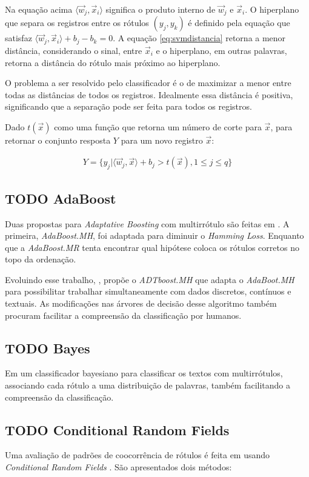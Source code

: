 \documentclass[runningheads,a4paper]{llncs}
\begin{document}
Na equação acima $\langle \vec{w}_j, \vec{x}_i \rangle$ significa o produto interno de $\vec{w}_j$ e $\vec{x}_i$. O hiperplano que separa os registros entre os rótulos $(y_j, y_k)$ é definido pela equação que satisfaz $\langle \vec{w}_j, \vec{x}_i \rangle + b_j - b_k = 0$.  A equação \ref{eq:svmdistancia} retorna a menor distância, considerando o sinal, entre $\vec{x}_i$ e o hiperplano, em outras palavras, retorna a distância do rótulo mais próximo ao hiperplano.

O problema a ser resolvido pelo classificador é o de maximizar a menor entre todas as distâncias de todos os registros. Idealmente essa distância é positiva, significando que a separação pode ser feita para todos os registros.

Dado $t(\vec{x})$ como uma função que retorna um número de corte para $\vec{x}$, para retornar o conjunto resposta $Y$ para um novo registro $\vec{x}$:

\begin{align*}
	Y = \{ y_j | \langle \vec{w}_j,\vec{x} \rangle + b_j > t(\vec{x}), 1 \leq j \leq q \}
\end{align*}

\subsection{TODO AdaBoost}
Duas propostas para \textit{Adaptative Boosting} com multirrótulo são feitas em \cite{Schapire2000-yt}. A primeira, \textit{AdaBoost.MH}, foi adaptada para diminuir o \textit{Hamming Loss}. Enquanto que a \textit{AdaBoost.MR} tenta encontrar qual hipótese coloca os rótulos corretos no topo da ordenação.

Evoluindo esse trabalho, \cite{De_Comite2003-lg}, propõe o \textit{ADTboost.MH} que adapta o \textit{AdaBoot.MH} para possibilitar trabalhar simultaneamente com dados discretos, contínuos e textuais. As modificações nas árvores de decisão desse algoritmo também procuram facilitar a compreensão da classificação por humanos.

\subsection{TODO Bayes}

Em \cite{McCallum1999-iz} um classificador bayesiano para classificar os textos com multirrótulos, associando cada rótulo a uma distribuição de palavras, também facilitando a compreensão da classificação.

\subsection{TODO Conditional Random Fields}
Uma avaliação de padrões de coocorrência de rótulos é feita em \cite{Ghamrawi2005-fw} usando \textit{Conditional Random Fields} \cite{Lafferty2001-ov}. São apresentados dois métodos: 
\end{document}
